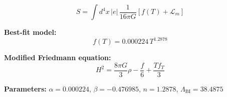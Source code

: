 
\begin{equation}
  S = \int d^4x \, |e| \, \frac{1}{16\pi G} \left[ f(T) + \mathcal{L}_m \right]
\end{equation}

\textbf{Best-fit model:}
\begin{equation}
  f(T) = 0.000224 \, T^{1.2878}
\end{equation}

\textbf{Modified Friedmann equation:}
\begin{equation}
  H^2 = \frac{8\pi G}{3} \rho - \frac{f}{6} + \frac{T f_T}{3}
\end{equation}

\textbf{Parameters:}
$\alpha = 0.000224$, \quad
$\beta = -0.476985$, \quad
$n = 1.2878$, \quad
$\Lambda_{\text{BI}} = 38.4875$